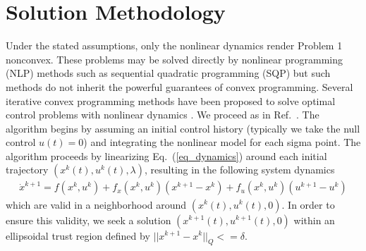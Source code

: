 \documentclass[10pt,a4paper]{article}
\begin{document}
		
	
	
	\section{Solution Methodology}
	Under the stated assumptions, only the nonlinear dynamics render Problem 1 nonconvex. These problems may be solved directly by nonlinear programming (NLP) methods such as sequential quadratic programming (SQP) but such methods do not inherit the powerful guarantees of convex programming.
	Several iterative convex programming methods have been proposed to solve optimal control problems with nonlinear dynamics \cite{SeqConProg,SuccConvex1}. We proceed as in Ref.~\cite{SuccConvex1}. The algorithm begins by assuming an initial control history (typically we take the null control $u(t)=0$) and integrating the nonlinear model for each sigma point. The algorithm proceeds by linearizing Eq.~(\ref{eq_dynamics}) around each initial trajectory $ (x^k(t),u^k(t),\lambda) $, resulting in the following system dynamics
	\begin{align}
	\dot{x}^{k+1} = f(x^{k},u^k) + f_x(x^k,u^k)(x^{k+1}-x^k) + f_u(x^k,u^k)(u^{k+1}-u^k) \label{eq_linearized}
	\end{align}
	which are valid in a neighborhood around $ (x^k(t),u^k(t),0) $. In order to ensure this validity, we seek a solution $ (x^{k+1}(t),u^{k+1}(t),0) $ within an ellipsoidal trust region defined by $||x^{k+1}-x^k||_Q <= \delta$.
	
	
		
\end{document}
